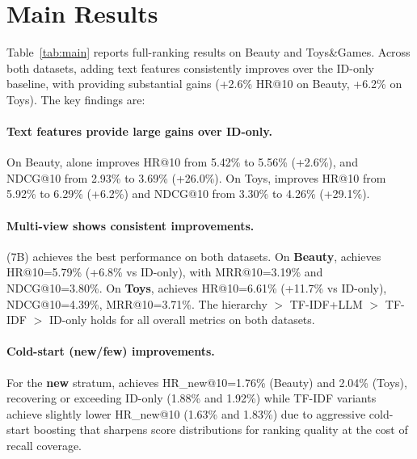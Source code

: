 \section{Main Results}
Table~\ref{tab:main} reports full-ranking results on Beauty
and Toys\&Games. Across both datasets, adding text features
consistently improves over the ID-only baseline, with \tfidf
providing substantial gains (+2.6\% HR@10 on Beauty, +6.2\%
on Toys). The key findings are:

\paragraph{Text features provide large gains over ID-only.}
On Beauty, \tfidf alone improves HR@10 from 5.42\% to 5.56\%
(+2.6\%), and NDCG@10 from 2.93\% to 3.69\% (+26.0\%). On
Toys, \tfidf improves HR@10 from 5.92\% to 6.29\% (+6.2\%)
and NDCG@10 from 3.30\% to 4.26\% (+29.1\%).


\paragraph{Multi-view shows consistent improvements.}
\model (7B) achieves the best performance on both datasets.
On \textbf{Beauty}, \model achieves HR@10=5.79\% (+6.8\% vs
ID-only), with MRR@10=3.19\% and NDCG@10=3.80\%. On
\textbf{Toys}, \model achieves HR@10=6.61\% (+11.7\% vs
ID-only), NDCG@10=4.39\%, MRR@10=3.71\%. The hierarchy
\model $>$ TF-IDF+LLM $>$ TF-IDF $>$ ID-only holds for all
overall metrics on both datasets.

\paragraph{Cold-start (new/few) improvements.}
For the \textbf{new} stratum, \model achieves HR\_new@10=1.76\%
(Beauty) and 2.04\% (Toys), recovering or exceeding ID-only
(1.88\% and 1.92\%) while TF-IDF variants achieve slightly
lower HR\_new@10 (1.63\% and 1.83\%) due to aggressive
cold-start boosting that sharpens score distributions for
ranking quality at the cost of recall coverage.


